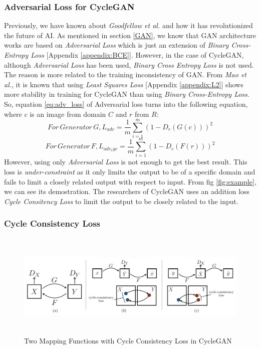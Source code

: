 \subsubsection{Adversarial Loss for CycleGAN} \label{cyc_adv}
Previously, we have known about \textit{Goodfellow et al.}\cite{goodfellow2014generative}  and how it has revolutionized the future of AI. As mentioned in section \ref{GAN}, we know that GAN\cite{goodfellow2014generative} architecture works are based on \textit{Adversarial Loss} which is just an extension of \textit{Binary Cross-Entropy Loss} [Appendix \ref{appendix:BCE}]. However, in the case of CycleGAN\cite{cyclegan}, although \textit{Adversarial Loss} has been used, \textit{Binary Cross Entropy Loss} is not used. The reason is more related to the training inconsistency of GAN\cite{goodfellow2014generative}. From \textit{Mao et al.}, it is known that using \textit{Least Squares Loss} [Appendix \ref{appendix:L2}] shows more stability in training for CycleGAN\cite{cyclegan} than using \textit{Binary Cross-Entropy Loss}. So, equation \ref{eq:adv_loss} of Adversarial loss turns into the following equation, where $c$ is an image from domain $C$ and $r$ from $R$:
    $$ For\, Generator\, G, L_{adv} = \frac{1}{m} \sum^m_{i=1}(1-D_r(G(c)))^2$$
    $$ For\, Generator\, F, L_{adv_cyc} = \frac{1}{m} \sum^m_{i=1}(1-D_c(F(r)))^2$$
However, using only \textit{Adversarial Loss} is not enough to get the best result. This loss is \textit{under-constraint} as it only limits the output to be of a specific domain and fails to limit a closely related output with respect to input. From fig \ref{fig:example}, we can see its demostration. The researchers of CycleGAN\cite{cyclegan} uses an addition loss \textit{Cycle Consitency Loss} to limit the output to be closely related to the input.

\subsubsection{Cycle Consistency Loss} \label{cyc_ccl}
\begin{figure}[ht]
\begin{center}
\includegraphics[width=5in,height=2in]{pic/fig3/fig3.jpg}
\caption{Two Mapping Functions with Cycle Consistency Loss in CycleGAN}
\end{center}
\label{fig:ccl_arch}
\end{figure}

